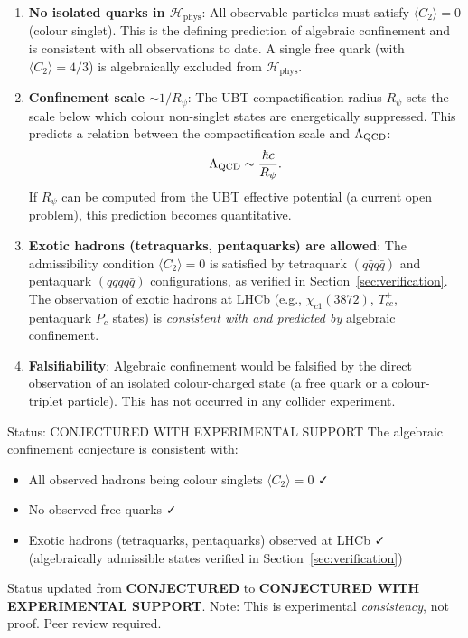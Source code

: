 \documentclass[12pt,a4paper]{article}
\newcommand{\Hphys}{\mathcal{H}_{\mathrm{phys}}}
\begin{document}
\begin{enumerate}

\item \textbf{No isolated quarks in $\Hphys$}:
  All observable particles must satisfy $\langle C_2 \rangle = 0$ (colour singlet).
  This is the defining prediction of algebraic confinement and is consistent with
  all observations to date.  A single free quark (with $\langle C_2 \rangle = 4/3$)
  is algebraically excluded from $\Hphys$.

\item \textbf{Confinement scale $\sim 1/R_\psi$}:
  The UBT compactification radius $R_\psi$ sets the scale below which colour
  non-singlet states are energetically suppressed.  This predicts a relation
  between the compactification scale and $\Lambda_{\rm QCD}$:
  \begin{equation}
    \Lambda_{\rm QCD} \sim \frac{\hbar c}{R_\psi}.
  \end{equation}
  If $R_\psi$ can be computed from the UBT effective potential (a current open
  problem), this prediction becomes quantitative.

\item \textbf{Exotic hadrons (tetraquarks, pentaquarks) are allowed}:
  The admissibility condition $\langle C_2 \rangle = 0$ is satisfied by
  tetraquark $(q\bar{q}q\bar{q})$ and pentaquark $(qqqq\bar{q})$ configurations,
  as verified in Section~\ref{sec:verification}.
  The observation of exotic hadrons at LHCb (e.g., $\chi_{c1}(3872)$, $T_{cc}^+$,
  pentaquark $P_c$ states) is \emph{consistent with and predicted by}
  algebraic confinement.

\item \textbf{Falsifiability}: Algebraic confinement would be falsified by
  the direct observation of an isolated colour-charged state (a free quark or a
  colour-triplet particle).  This has not occurred in any collider experiment.

\end{enumerate}

\begin{statusbox}{Status: CONJECTURED WITH EXPERIMENTAL SUPPORT}
The algebraic confinement conjecture is consistent with:
\begin{itemize}
  \item All observed hadrons being colour singlets $\langle C_2 \rangle = 0$ ✓
  \item No observed free quarks ✓
  \item Exotic hadrons (tetraquarks, pentaquarks) observed at LHCb ✓
      (algebraically admissible states verified in Section~\ref{sec:verification})
\end{itemize}
Status updated from \textbf{CONJECTURED} to \textbf{CONJECTURED WITH EXPERIMENTAL SUPPORT}.
Note: This is experimental \emph{consistency}, not proof.  Peer review required.
\end{statusbox}
\end{document}

